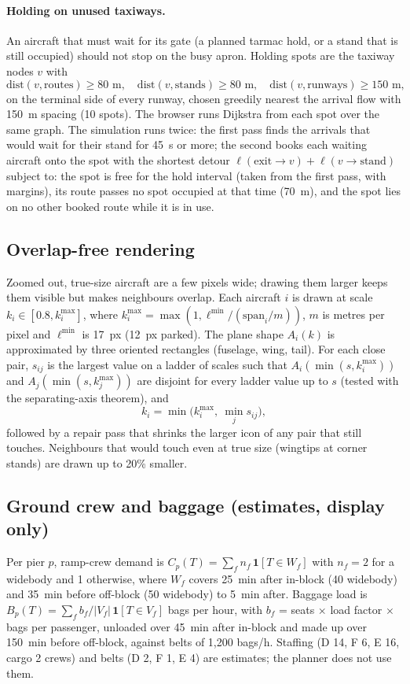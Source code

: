 \documentclass[11pt]{article}
\theoremstyle{remark}
\newcommand{\ind}[1]{\mathbf{1}\!\left[#1\right]}
\begin{document}
\paragraph{Holding on unused taxiways.} An aircraft that must wait for its gate (a planned tarmac
hold, or a stand that is still occupied) should not stop on the busy apron. Holding spots are the
taxiway nodes $v$ with
\begin{equation}
\mathrm{dist}(v,\text{routes})\ge80\text{ m},\quad \mathrm{dist}(v,\text{stands})\ge80\text{ m},\quad
\mathrm{dist}(v,\text{runways})\ge150\text{ m},
\end{equation}
on the terminal side of every runway, chosen greedily nearest the arrival flow with 150~m spacing (10
spots). The browser runs Dijkstra from each spot over the same graph. The simulation runs twice: the
first pass finds the arrivals that would wait for their stand for 45~s or more; the second books each
waiting aircraft onto the spot with the shortest detour $\ell(\text{exit}\to v)+\ell(v\to\text{stand})$
subject to: the spot is free for the hold interval (taken from the first pass, with margins), its
route passes no spot occupied at that time (70~m), and the spot lies on no other booked route while
it is in use.

\subsection{Overlap-free rendering}
Zoomed out, true-size aircraft are a few pixels wide; drawing them larger keeps them visible but
makes neighbours overlap. Each aircraft $i$ is drawn at scale $k_i\in[0.8,k_i^{\max}]$, where
$k_i^{\max}=\max(1, \ell^{\min}/(\text{span}_i/m))$, $m$ is metres per pixel and $\ell^{\min}$ is 17~px
(12~px parked). The plane shape $A_i(k)$ is approximated by three oriented rectangles (fuselage, wing,
tail). For each close pair, $s_{ij}$ is the largest value on a ladder of scales such that $A_i(\min(s,
k_i^{\max}))$ and $A_j(\min(s,k_j^{\max}))$ are disjoint for every ladder value up to $s$ (tested with
the separating-axis theorem), and
\begin{equation}
k_i=\min\Big(k_i^{\max},\ \min_j s_{ij}\Big),
\end{equation}
followed by a repair pass that shrinks the larger icon of any pair that still touches. Neighbours that
would touch even at true size (wingtips at corner stands) are drawn up to 20\% smaller.

\subsection{Ground crew and baggage (estimates, display only)}
Per pier $p$, ramp-crew demand is $C_p(T)=\sum_f n_f\,\ind{T\in W_f}$ with $n_f=2$ for a widebody and
1 otherwise, where $W_f$ covers 25~min after in-block (40 widebody) and 35~min before off-block (50
widebody) to 5~min after. Baggage load is $B_p(T)=\sum_f b_f/\lvert V_f\rvert\,\ind{T\in V_f}$ bags per
hour, with $b_f$ = seats $\times$ load factor $\times$ bags per passenger, unloaded over 45~min after
in-block and made up over 150~min before off-block, against belts of 1{,}200 bags/h. Staffing (D 14,
F 6, E 16, cargo 2 crews) and belts (D 2, F 1, E 4) are estimates; the planner does not use them.
\end{document}
